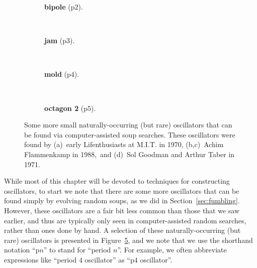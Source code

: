 \begin{figure}[!htb]
	\centering
	\begin{subfigure}{.2\textwidth}
		\centering
		\caption{\textbf{bipole} (p$2$).}
		\label{fig:bipole}
	\end{subfigure} \ \ \ \ %
	\begin{subfigure}{.2\textwidth}
		\centering
		\caption{\textbf{jam} (p$3$).}
		\label{fig:jam}
	\end{subfigure} \ \ \ \ %
	\begin{subfigure}{.2\textwidth}
		\centering
		\caption{\textbf{mold} (p$4$).}
		\label{fig:mold}
	\end{subfigure} \ \ \ \ %
	\begin{subfigure}{.23\textwidth}
		\centering
		\caption{\textbf{octagon 2} (p$5$).}
		\label{fig:octagon_2}
	\end{subfigure}
	\caption{Some more small naturally-occurring (but rare) oscillators that can be found via computer-assisted soup searches. These oscillators were found by (a)~early Lifenthusiasts at M.I.T. in 1970, (b,c)~Achim Flammenkamp in 1988,\protect\footnotemark \ and (d)~Sol Goodman and Arthur Taber in 1971.}\label{fig:natural_but_rare_oscillators}
\end{figure}

While most of this chapter will be devoted to techniques for constructing oscillators, to start we note that there are some more oscillators that can be found simply by evolving random soups, as we did in Section~\ref{sec:fumbling}. However, these oscillators are a fair bit less common than those that we saw earlier, and thus are typically only seen in computer-assisted random searches, rather than ones done by hand. A selection of these naturally-occurring (but rare) oscillators is presented in Figure~\ref{fig:natural_but_rare_oscillators}, and we note that we use the shorthand notation ``p$n$'' to stand for ``period $n$''. For example, we often abbreviate expressions like ``period $4$ oscillator'' as ``p$4$ oscillator''.


